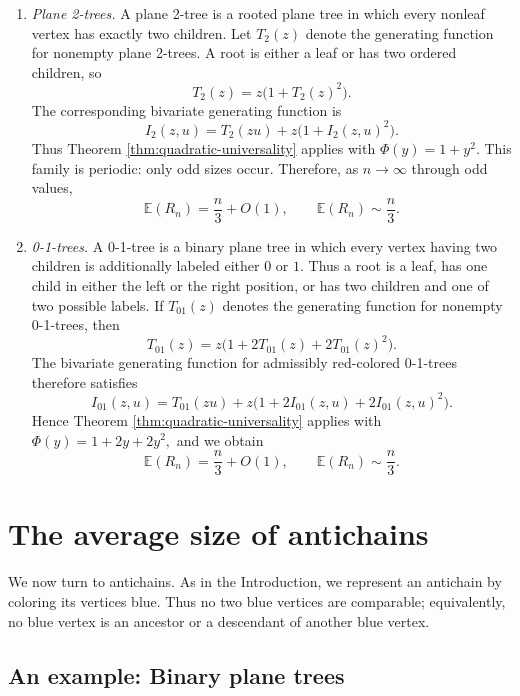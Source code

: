 \documentclass[11pt, onesided]{amsart}
\theoremstyle{remark}
\begin{document}
\begin{enumerate}
The same two-coloring of rooted plane trees was considered by Dimitrov,
Fox, Hadaway, Tharp, and Wagner~\cite{DimitrovFoxHadawayTharpWagner},
who studied its enumeration within a general framework for local
parent--child coloring rules, rather than the asymptotic size of the red
set considered here.

\item \emph{Plane 2-trees.}
A plane 2-tree is a rooted plane tree in which every nonleaf vertex has exactly two children. Let $T_2(z)$ denote the generating function for nonempty plane 2-trees. A root is either a leaf or has two ordered children, so
\[
T_2(z)=z\bigl(1+T_2(z)^2\bigr).
\]
The corresponding bivariate generating function is
\[
I_2(z,u)
=
T_2(zu)+z\bigl(1+I_2(z,u)^2\bigr).
\]
Thus Theorem \ref{thm:quadratic-universality} applies with
$
\Phi(y)=1+y^2.
$ 
This family is periodic: only odd sizes occur. Therefore, as $n\to\infty$ through odd values,
\[
\mathbb E(R_n)=\frac{n}{3}+O(1),
\qquad
\mathbb E(R_n)\sim\frac{n}{3}.
\]

\item \emph{0-1-trees.}
A 0-1-tree is a binary plane tree in which every vertex having two children is additionally labeled either $0$ or $1$. Thus a root is a leaf, has one child in either the left or the right position, or has two children and one of two possible labels. If $T_{01}(z)$ denotes the generating function for nonempty 0-1-trees, then
\[
T_{01}(z)
=
z\bigl(1+2T_{01}(z)+2T_{01}(z)^2\bigr).
\]
The bivariate generating function for admissibly red-colored 0-1-trees therefore satisfies
\[
I_{01}(z,u)
=
T_{01}(zu)
+z\bigl(1+2I_{01}(z,u)+2I_{01}(z,u)^2\bigr).
\]
Hence Theorem \ref{thm:quadratic-universality} applies with
$
\Phi(y)=1+2y+2y^2,
$
and we obtain
\[
\mathbb E(R_n)=\frac{n}{3}+O(1),
\qquad
\mathbb E(R_n)\sim\frac{n}{3}.
\]

\end{enumerate}


\section{The average size of antichains}
\label{sec:antichains}

We now turn to antichains.  As in the Introduction, we represent an antichain by coloring its vertices blue.  Thus no two blue vertices are comparable; equivalently, no blue vertex is an ancestor or a descendant of another blue vertex.

\subsection{An example: Binary plane trees}
\label{sec:binaryBlue}
\end{document}
